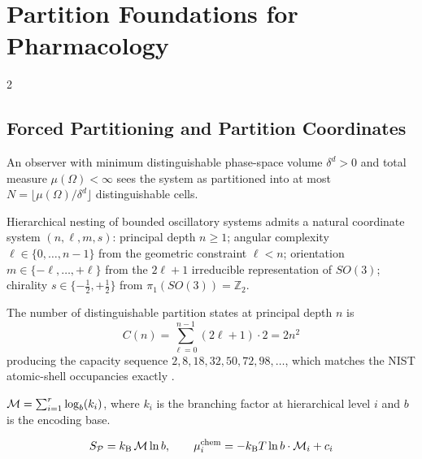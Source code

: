 \section{Partition Foundations for Pharmacology}
\label{sec:ch12_foundations}

\begin{multicols}{2}

\subsection{Forced Partitioning and Partition Coordinates}

\begin{theorem}
\label{thm:ch12_forced}
An observer with minimum distinguishable phase-space volume $\delta^d > 0$ and total measure $\mu(\Omega) < \infty$ sees the system as partitioned into at most $N = \lfloor\mu(\Omega)/\delta^d\rfloor$ distinguishable cells.
\end{theorem}

Hierarchical nesting of bounded oscillatory systems admits a natural coordinate system $(n, \ell, m, s)$: principal depth $n \geq 1$; angular complexity $\ell \in \{0, \ldots, n-1\}$ from the geometric constraint $\ell < n$; orientation $m \in \{-\ell, \ldots, +\ell\}$ from the $2\ell+1$ irreducible representation of $SO(3)$; chirality $s \in \{-\frac{1}{2}, +\frac{1}{2}\}$ from $\pi_1(SO(3)) = \mathbb{Z}_2$.

\begin{theorem}
\label{thm:ch12_capacity}
The number of distinguishable partition states at principal depth $n$ is
\begin{equation}
C(n) = \sum_{\ell=0}^{n-1}(2\ell+1)\cdot 2 = 2n^2
\label{eq:ch12_capacity}
\end{equation}
producing the capacity sequence $2, 8, 18, 32, 50, 72, 98, \ldots$, which matches the NIST atomic-shell occupancies exactly \citep{nist_asd}.
\end{theorem}

\begin{definition}
\label{def:ch12_depth}
$\mathcal{M} = \sum_{i=1}^{r}\log_b(k_i)$, where $k_i$ is the branching factor at hierarchical level $i$ and $b$ is the encoding base.
\end{definition}

\begin{theorem}
\label{thm:ch12_depth_equiv}
\begin{equation}
S_{\mathcal{P}} = k_{\mathrm{B}}\,\mathcal{M}\ln b, \qquad \mu_i^{\mathrm{chem}} = -k_{\mathrm{B}} T\ln b\cdot\mathcal{M}_i + c_i
\label{eq:ch12_chem_pot}
\end{equation}
\end{theorem}


\end{multicols}
